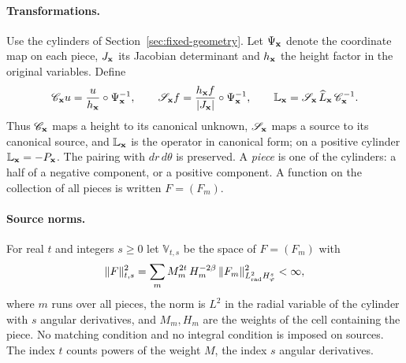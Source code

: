 \paragraph{Transformations.}
Use the cylinders of Section~\ref{sec:fixed-geometry}. Let
$\Psi_{\mathbf x}$ denote the coordinate map on each piece, $J_{\mathbf x}$ its
Jacobian determinant and $h_{\mathbf x}$ the height factor in the original
variables. Define
\[
 \mathscr C_{\mathbf x}u=\frac{u}{h_{\mathbf x}}\circ\Psi_{\mathbf x}^{-1},
 \qquad
 \mathscr S_{\mathbf x}f=\frac{h_{\mathbf x}f}{|J_{\mathbf x}|}\circ\Psi_{\mathbf x}^{-1},
 \qquad
 \mathbb L_{\mathbf x}=
 \mathscr S_{\mathbf x}\,\widehat L_{\mathbf x}\,\mathscr C_{\mathbf x}^{-1} .
\]
Thus $\mathscr C_{\mathbf x}$ maps a height to its canonical unknown,
$\mathscr S_{\mathbf x}$ maps a source to its canonical source, and
$\mathbb L_{\mathbf x}$ is the operator in canonical form; on a positive
cylinder $\mathbb L_{\mathbf x}=-P_{\mathbf x}$. The pairing with $dr\,d\theta$ is
preserved. A \emph{piece} is one of the cylinders: a half of a
negative component, or a positive component. A function on the
collection of all pieces is written $F=(F_m)$.

\paragraph{Source norms.}
For real $t$ and integers $s\ge0$ let $\mathbb V_{t,s}$ be the space
of $F=(F_m)$ with
\begin{equation}\label{eq:vol-source-spaces}
 \|F\|_{t,s}^2
 =\sum_m M_m^{2t}\,H_m^{-2\beta}\,
                  \|F_m\|_{L^2_{\rm rad}H^s_\varphi}^2<\infty ,
\end{equation}
where $m$ runs over all pieces, the norm is $L^2$ in the radial
variable of the cylinder with $s$ angular derivatives, and $M_m,H_m$
are the weights of the cell containing the piece. No matching
condition and no integral condition is imposed on sources. The index
$t$ counts powers of the weight $M$, the index $s$ angular
derivatives.

